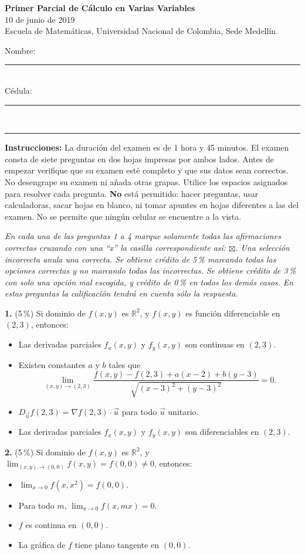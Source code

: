 \documentclass[11pt]{article}
\newcommand{\examheader}{%
  \noindent
  \begin{minipage}[t]{0.62\linewidth}
    {\bfseries\large Primer Parcial de C\'alculo en Varias Variables}\\
    {\small 10 de junio de 2019}\\
    {\small Escuela de Matem\'aticas, Universidad Nacional de Colombia, Sede Medell\'in.}
  \end{minipage}%
  \hfill
  \begin{minipage}[t]{0.33\linewidth}
    \raggedleft\small
    Nombre: \rule{2.8cm}{0.4pt}\\[4pt]
    C\'edula: \rule{2.8cm}{0.4pt}
  \end{minipage}\\[4pt]
  \rule{\linewidth}{0.6pt}
}
\begin{document}
\examheader

\textbf{Instrucciones:} La duraci\'on del examen es de 1 hora y 45 minutos. El examen consta de siete preguntas en dos hojas impresas por ambos lados. Antes de empezar verifique que su examen est\'e completo y que sus datos sean correctos. No desengrape su examen ni a\~nada otras grapas. Utilice los espacios asignados para resolver cada pregunta. \textbf{No} est\'a permitido: hacer preguntas, usar calculadoras, sacar hojas en blanco, ni tomar apuntes en hojas diferentes a las del examen. No se permite que ning\'un celular se encuentre a la vista.

\bigskip

\textit{En cada una de las preguntas 1 a 4 marque solamente todas las afirmaciones correctas cruzando con una ``x'' la casilla correspondiente as\'i: $\boxtimes$. Una selecci\'on incorrecta anula una correcta. Se obtiene cr\'edito de 5\,\% marcando todas las opciones correctas y no marcando todas las incorrectas. Se obtiene cr\'edito de 3\,\% con solo una opci\'on mal escogida, y cr\'edito de 0\,\% en todos los dem\'as casos. En estas preguntas la calificaci\'on tendr\'a en cuenta s\'olo la respuesta.}

\bigskip
\noindent\textbf{1.} (5\,\%) Si dominio de $f(x,y)$ es $\mathbb{R}^2$, y $f(x,y)$ es funci\'on diferenciable en $(2,3)$, entonces:

\begin{itemize}[itemsep=1pt,topsep=2pt,leftmargin=1.8em]
  \item[$\square$] Las derivadas parciales $f_x(x,y)$ y $f_y(x,y)$ son continuas en $(2,3)$.
  \item[$\square$] Existen constantes $a$ y $b$ tales que
  $$\lim_{(x,y)\to(2,3)} \frac{f(x,y)-f(2,3)+a(x-2)+b(y-3)}{\sqrt{(x-3)^2+(y-3)^2}} = 0.$$
  \item[$\square$] $D_{\vec u}f(2,3) = \nabla f(2,3)\cdot \vec u$ para todo $\vec u$ unitario.
  \item[$\square$] Las derivadas parciales $f_x(x,y)$ y $f_y(x,y)$ son diferenciables en $(2,3)$.
\end{itemize}

\bigskip
\noindent\textbf{2.} (5\,\%) Si dominio de $f(x,y)$ es $\mathbb{R}^2$, y $\displaystyle\lim_{(x,y)\to(0,0)} f(x,y) = f(0,0)\neq 0$, entonces:

\begin{itemize}[itemsep=1pt,topsep=2pt,leftmargin=1.8em]
  \item[$\square$] $\displaystyle\lim_{x\to 0} f(x,x^2) = f(0,0)$.
  \item[$\square$] Para todo $m$, $\displaystyle\lim_{x\to 0} f(x,mx) = 0$.
  \item[$\square$] $f$ es continua en $(0,0)$.
  \item[$\square$] La gr\'afica de $f$ tiene plano tangente en $(0,0)$.
\end{itemize}
\end{document}
